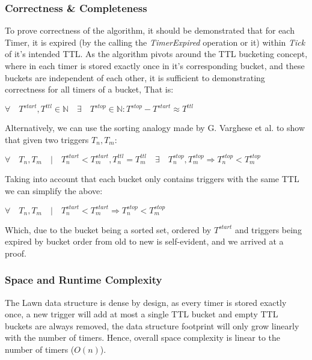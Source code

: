 \documentclass[twocolumn,a4paper]{article}
\begin{document}
\subsubsection{Correctness \& Completeness}
To prove correctness of the algorithm,  it should be demonstrated that for each Timer, it is expired (by the calling the \textit{TimerExpired} operation or it) within \textit{Tick} of it's intended TTL. As the algorithm pivots around the TTL bucketing concept, where in each timer is stored exactly once in it's corresponding bucket, and these buckets are independent of each other, it is sufficient to demonstrating correctness for all timers of a bucket, That is:
\begin{center}
	$\forall \quad T^{start}, T^{ttl} \in \mathbb{N} \quad \exists \quad T^{stop} \in \mathbb{N} : T^{stop}-T^{start} \approx T^{ttl}$
\end{center}

Alternatively, we can use the sorting analogy made by G. Varghese et al.\cite{TW} to show that given two triggers $T_n, T_m$: 

\begin{center}
	$\forall \quad T_n, T_m \quad | \quad T^{start}_n<T^{start}_m,  T^{ttl}_n = T^{ttl}_m \quad \exists\quad T^{stop}_n, T^{stop}_m  \Rightarrow T^{stop}_n < T^{stop}_m$
\end{center}

Taking into account that each bucket only contains triggers with the same TTL we can simplify the above:

\begin{center}
	$\forall \quad T_n, T_m \quad | \quad T^{start}_n<T^{start}_m \Rightarrow T^{stop}_n < T^{stop}_m$
\end{center}

Which, due to the bucket being a sorted set, ordered by $T^{start}$ and triggers being expired by bucket order from old to new is self-evident, and we arrived at a proof.

\subsubsection{Space and Runtime Complexity}
The Lawn data structure is dense by design, as every timer is stored exactly once, a new trigger will add at most a single TTL bucket and empty TTL buckets are always removed, the data structure footprint will only grow linearly with the number of timers. Hence, overall space complexity is linear to the number of timers ($O(n)$). 
\end{document}
